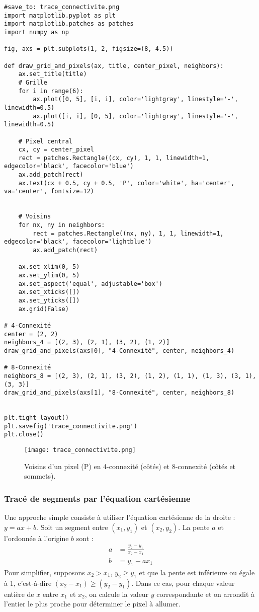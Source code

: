 \documentclass{article}
\begin{document}
\begin{verbatim}
#save_to: trace_connectivite.png
import matplotlib.pyplot as plt
import matplotlib.patches as patches
import numpy as np

fig, axs = plt.subplots(1, 2, figsize=(8, 4.5))

def draw_grid_and_pixels(ax, title, center_pixel, neighbors):
    ax.set_title(title)
    # Grille
    for i in range(6):
        ax.plot([0, 5], [i, i], color='lightgray', linestyle='-', linewidth=0.5)
        ax.plot([i, i], [0, 5], color='lightgray', linestyle='-', linewidth=0.5)

    # Pixel central
    cx, cy = center_pixel
    rect = patches.Rectangle((cx, cy), 1, 1, linewidth=1, edgecolor='black', facecolor='blue')
    ax.add_patch(rect)
    ax.text(cx + 0.5, cy + 0.5, 'P', color='white', ha='center', va='center', fontsize=12)


    # Voisins
    for nx, ny in neighbors:
        rect = patches.Rectangle((nx, ny), 1, 1, linewidth=1, edgecolor='black', facecolor='lightblue')
        ax.add_patch(rect)

    ax.set_xlim(0, 5)
    ax.set_ylim(0, 5)
    ax.set_aspect('equal', adjustable='box')
    ax.set_xticks([])
    ax.set_yticks([])
    ax.grid(False)

# 4-Connexité
center = (2, 2)
neighbors_4 = [(2, 3), (2, 1), (3, 2), (1, 2)]
draw_grid_and_pixels(axs[0], "4-Connexité", center, neighbors_4)

# 8-Connexité
neighbors_8 = [(2, 3), (2, 1), (3, 2), (1, 2), (1, 1), (1, 3), (3, 1), (3, 3)]
draw_grid_and_pixels(axs[1], "8-Connexité", center, neighbors_8)


plt.tight_layout()
plt.savefig('trace_connectivite.png')
plt.close()
\end{verbatim}

\begin{figure}[H]
\centering
\texttt{[image: trace\_connectivite.png]}
\caption{Voisins d'un pixel (P) en 4-connexité (côtés) et 8-connexité (côtés et sommets).}
\label{fig:trace_connectivite}
\end{figure}

\subsubsection{Tracé de segments par l'équation cartésienne}
Une approche simple consiste à utiliser l'équation cartésienne de la droite : $y = ax + b$.
Soit un segment entre $(x_1, y_1)$ et $(x_2, y_2)$. La pente $a$ et l'ordonnée à l'origine $b$ sont :
\begin{align*} a &= \frac{y_2 - y_1}{x_2 - x_1} \\ b &= y_1 - a x_1 \end{align*}
Pour simplifier, supposons $x_2 > x_1$, $y_2 \ge y_1$ et que la pente est inférieure ou égale à 1, c'est-à-dire $(x_2 - x_1) \ge (y_2 - y_1)$. Dans ce cas, pour chaque valeur entière de $x$ entre $x_1$ et $x_2$, on calcule la valeur $y$ correspondante et on arrondit à l'entier le plus proche pour déterminer le pixel à allumer.
\end{document}

